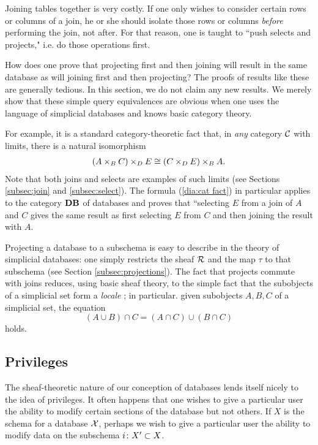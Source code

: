 \documentclass{amsart}
\begin{document}
Joining tables together is very costly.  If one only wishes to consider certain rows or columns of a join, he or she should isolate those rows or columns {\em before} performing the join, not after.  For that reason, one is taught to ``push selects and projects," i.e. do those operations first.

How does one prove that projecting first and then joining will result in the same database as will joining first and then projecting?  The proofs of results like these are generally tedious.  In this section, we do not claim any new results.  We merely show that these simple query equivalences are obvious when one uses the language of simplicial databases and knows basic category theory. 

For example, it is a standard category-theoretic fact that, in {\em any} category $\mathcal{C}$ with limits, there is a natural isomorphism \begin{eqnarray}\label{dia:cat fact}(A\times_BC)\times_DE\cong (C\times_DE)\times_BA.\end{eqnarray}  Note that both joins and selects are examples of such limits (see Sections \ref{subsec:join} and \ref{subsec:select}).  The formula (\ref{dia:cat fact}) in particular applies to the category ${\bf DB}$ of databases and proves that ``selecting $E$ from a join of $A$ and $C$ gives the same result as first selecting $E$ from $C$ and then joining the result with $A$.

Projecting a database to a subschema is easy to describe in the theory of simplicial databases: one simply restricts the sheaf $\mathcal{R}$ and the map $\tau$ to that subschema (see Section \ref{subsec:projections}).  The fact that projects commute with joins reduces, using basic sheaf theory, to the simple fact that the subobjects of a simplicial set form a {\em locale} \cite[1.3.2]{Bor3}; in particular. given subobjects $A,B,C$ of a simplicial set, the equation $$(A\cup B)\cap C=(A\cap C)\cup (B\cap C)$$ holds.  

\subsection{Privileges}\label{subsec:privileges}

The sheaf-theoretic nature of our conception of databases lends itself nicely to the idea of privileges.  It often happens that one wishes to give a particular user the ability to modify certain sections of the database but not others.  If $X$ is the schema for a database $\mathcal{X}$, perhaps we wish to give a particular user the ability to modify data on the subschema $i\colon X'\subset X$.  
\end{document}
